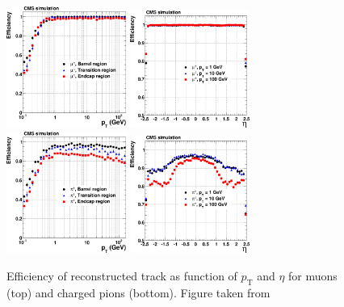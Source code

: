 \begin{figure}[ht]
  \begin{center}
    \includegraphics[width=0.35\textwidth]{figuras/Chapter3/TrackEff_Muon_pt.png}
    \includegraphics[width=0.35\textwidth]{figuras/Chapter3/TrackEff_Muon_eta.png}
    \includegraphics[width=0.35\textwidth]{figuras/Chapter3/TrackEff_Pion_pt.png}
    \includegraphics[width=0.35\textwidth]{figuras/Chapter3/TrackEff_Pion_eta.png}
    \caption{Efficiency of reconstructed track as function of $p_{\textrm{T}}$ and $\eta$ for 
    muons (top) and charged pions (bottom). Figure taken from \cite{Chatrchyan:2014fea}}
    \label{fig:Track_Efficiencies}
  \end{center}
\end{figure}

